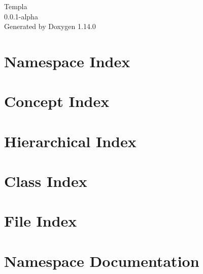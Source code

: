 \documentclass[twoside]{book}
\newcommand{\+}{\discretionary{\mbox{\scriptsize$\hookleftarrow$}}{}{}}
\newcommand{\clearemptydoublepage}{%
    \newpage{\pagestyle{empty}\cleardoublepage}%
  }
\begin{document}
  \raggedbottom
    \hypersetup{pageanchor=false,
                bookmarksnumbered=true,
                pdfencoding=unicode
               }
  \begin{titlepage}
  \vspace*{7cm}
  \begin{center}%
  {\Large Templa}\\
  [1ex]\large 0.\+0.\+1-\/alpha \\
  \vspace*{1cm}
  {\large Generated by Doxygen 1.14.0}\\
  \end{center}
  \end{titlepage}
  \clearemptydoublepage
  \tableofcontents
  \clearemptydoublepage
  \hypersetup{pageanchor=true}
\chapter{Namespace Index}

\chapter{Concept Index}

\chapter{Hierarchical Index}

\chapter{Class Index}

\chapter{File Index}

\chapter{Namespace Documentation}










\end{document}
